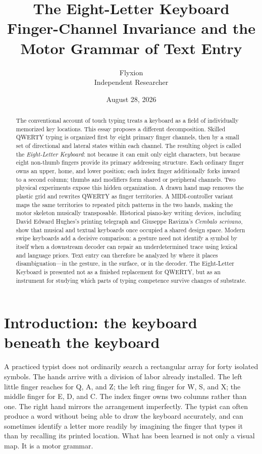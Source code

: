 \documentclass[11pt]{article}
\title{\vspace{-1.5cm}\textsf{\bfseries The Eight-Letter Keyboard}\\[0.4em]
\large Finger-Channel Invariance and the Motor Grammar of Text Entry}
\author{Flyxion\\\small Independent Researcher}
\date{August 28, 2026}
\begin{document}
\maketitle

\begin{abstract}
The conventional account of touch typing treats a keyboard as a field of individually memorized key locations. This essay proposes a different decomposition. Skilled QWERTY typing is organized first by eight primary finger channels, then by a small set of directional and lateral states within each channel. The resulting object is called the \emph{Eight-Letter Keyboard}: not because it can emit only eight characters, but because eight non-thumb fingers provide its primary addressing structure. Each ordinary finger owns an upper, home, and lower position; each index finger additionally forks inward to a second column; thumbs and modifiers form shared or peripheral channels. Two physical experiments expose this hidden organization. A drawn hand map removes the plastic grid and rewrites QWERTY as finger territories. A MIDI-controller variant maps the same territories to repeated pitch patterns in the two hands, making the motor skeleton musically transposable. Historical piano-key writing devices, including David Edward Hughes's printing telegraph and Giuseppe Ravizza's \emph{Cembalo scrivano}, show that musical and textual keyboards once occupied a shared design space. Modern swipe keyboards add a decisive comparison: a gesture need not identify a symbol by itself when a downstream decoder can repair an underdetermined trace using lexical and language priors. Text entry can therefore be analyzed by where it places disambiguation---in the gesture, in the surface, or in the decoder. The Eight-Letter Keyboard is presented not as a finished replacement for QWERTY, but as an instrument for studying which parts of typing competence survive changes of substrate.
\end{abstract}

\tableofcontents
\newpage

\section{Introduction: the keyboard beneath the keyboard}

A practiced typist does not ordinarily search a rectangular array for forty isolated symbols. The hands arrive with a division of labor already installed. The left little finger reaches for Q, A, and Z; the left ring finger for W, S, and X; the middle finger for E, D, and C. The index finger owns two columns rather than one. The right hand mirrors the arrangement imperfectly. The typist can often produce a word without being able to draw the keyboard accurately, and can sometimes identify a letter more readily by imagining the finger that types it than by recalling its printed location. What has been learned is not only a visual map. It is a motor grammar.
\end{document}

